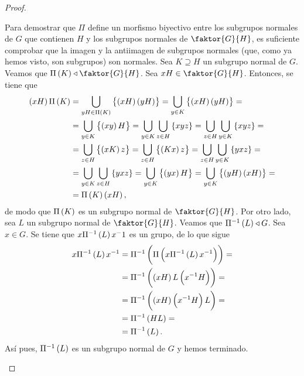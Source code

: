 \begin{proof}
\begin{enumerate}[i)]
            \noindent Para demostrar que $\Pi$ define un morfismo biyectivo entre los subgrupos normales de $G$ que contienen $H$ y los subgrupos normales de $\faktor{G}{H}$, es suficiente comprobar que la imagen y la antiimagen de subgrupos normales (que, como ya hemos visto, son subgrupos) son normales. Sea $K\supseteq H$ un subgrupo normal de $G$. Veamos que $\Pi\lp K\rp\triangleleft \faktor{G}{H}$. Sea $xH\in\faktor{G}{H}$. Entonces, se tiene que 
            \begin{align*}
                \left( xH\right) \Pi\left( K\right) &= \bigcup_{yH\in\Pi\left( K\right)}\left\{\left( xH\right)\left( yH\right)\right\} = \bigcup_{y\in K}\left\{\left( xH\right)\left( yH\right)\right\} =\\
                &= \bigcup_{y\in K}\left\{\left( xy\right) H\right\} = \bigcup_{y\in K}\bigcup_{z\in H}\left\{ xyz\right\} = \bigcup_{z\in H}\bigcup_{y\in K}\left\{ xyz\right\} =\\ 
                &= \bigcup_{z\in H}\left\{ \left( xK\right) z\right\} = \bigcup_{z\in H}\left\{ \left( Kx\right) z\right\} = \bigcup_{z\in H}\bigcup_{y\in K}\left\{ yxz\right\} =\\ 
                &= \bigcup_{y\in K}\bigcup_{z\in H}\left\{ yxz\right\} = \bigcup_{y\in K}\left\{\left( yx\right) H\right\} = \bigcup_{y\in K}\left\{\left( yH\right)\left( xH\right)\right\} =\\
                &= \Pi\left( K\right)\left( xH\right),
            \end{align*}    
            de modo que $\Pi\left( K\right)$ es un subgrupo normal de $\faktor{G}{H}$. Por otro lado, sea $L$ un subgrupo normal de $\faktor{G}{H}$. Veamos que $\Pi^{-1}\left( L\right)\triangleleft G$. Sea $x\in G$. Se tiene que $x\Pi^{-1}\left( L\right) x^-1$ es un grupo, de lo que sigue
            \begin{align*}
                x\Pi^{-1}\left( L\right) x^{-1} &= \Pi^{-1}\left( \Pi\left( x\Pi^{-1}\left( L\right) x^{-1}\right)\right) =\\
                &=\Pi^{-1}\left( \left( xH\right) L \left( x^{-1}H\right)\right) =\\
                &=\Pi^{-1}\left( \left( xH\right) \left( x^{-1}H\right) L\right) =\\
                &=\Pi^{-1}\left( HL\right) =\\
                &=\Pi^{-1}\left( L\right).
            \end{align*}
            Así pues, $\Pi^{-1}\left( L\right)$ es un subgrupo normal de $G$ y hemos terminado.
    \end{enumerate}
\end{proof}

